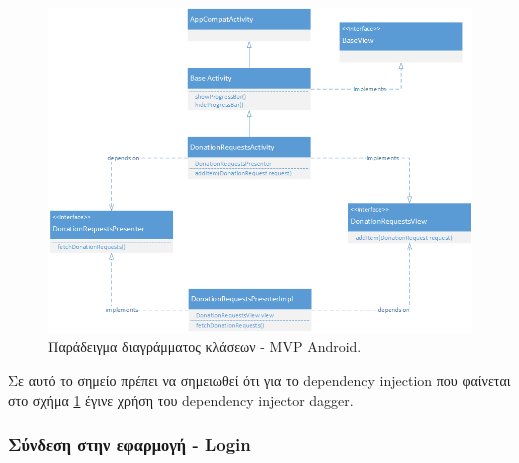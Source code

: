 	\begin{figure}[h]
	    \centering
	    \includegraphics[width=1.1\textwidth]{android_mvp_example_class_diagram.png}
	    \caption{Παράδειγμα διαγράμματος κλάσεων - MVP Android.}
	    \label{fig:android_mvp_example_class_diagram}
	\end{figure}
	
	Σε αυτό το σημείο πρέπει να σημειωθεί ότι για το dependency injection που φαίνεται στο σχήμα \ref{fig:android_mvp_example_class_diagram} έγινε χρήση του dependency injector dagger\cite{daggerAndroid}. 
	
   		\subsubsection{Σύνδεση στην εφαρμογή - Login}
   		
